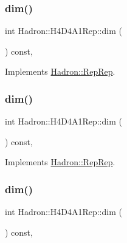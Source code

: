 \subsubsection{\texorpdfstring{dim()}{dim()}\hspace{0.1cm}{\footnotesize\ttfamily [3/5]}}
{\footnotesize\ttfamily int Hadron\+::\+H4\+D4\+A1\+Rep\+::dim (\begin{DoxyParamCaption}{ }\end{DoxyParamCaption}) const\hspace{0.3cm}{\ttfamily [inline]}, {\ttfamily [virtual]}}



Implements \mbox{\hyperlink{structHadron_1_1RepRep_a92c8802e5ed7afd7da43ccfd5b7cd92b}{Hadron\+::\+Rep\+Rep}}.

\mbox{\label{structHadron_1_1H4D4A1Rep_ac8019302ca0c70527f76bd346de43b43}} 
\subsubsection{\texorpdfstring{dim()}{dim()}\hspace{0.1cm}{\footnotesize\ttfamily [4/5]}}
{\footnotesize\ttfamily int Hadron\+::\+H4\+D4\+A1\+Rep\+::dim (\begin{DoxyParamCaption}{ }\end{DoxyParamCaption}) const\hspace{0.3cm}{\ttfamily [inline]}, {\ttfamily [virtual]}}



Implements \mbox{\hyperlink{structHadron_1_1RepRep_a92c8802e5ed7afd7da43ccfd5b7cd92b}{Hadron\+::\+Rep\+Rep}}.

\mbox{\label{structHadron_1_1H4D4A1Rep_ac8019302ca0c70527f76bd346de43b43}} 
\subsubsection{\texorpdfstring{dim()}{dim()}\hspace{0.1cm}{\footnotesize\ttfamily [5/5]}}
{\footnotesize\ttfamily int Hadron\+::\+H4\+D4\+A1\+Rep\+::dim (\begin{DoxyParamCaption}{ }\end{DoxyParamCaption}) const\hspace{0.3cm}{\ttfamily [inline]}, {\ttfamily [virtual]}}



